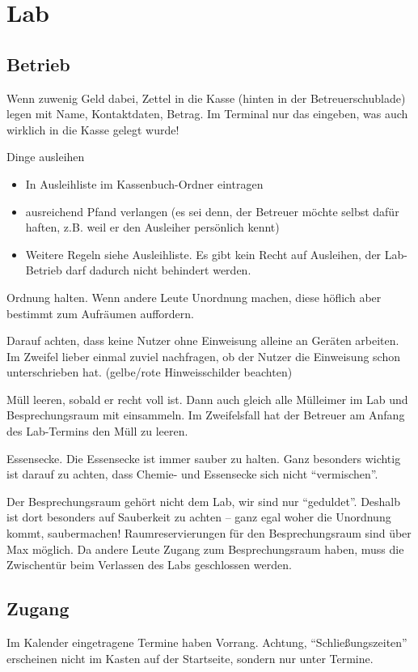 \documentclass{\basedir/fablab-document}
\begin{document}
\section{Lab}
\subsection{Betrieb}
Wenn zuwenig Geld dabei, Zettel in die Kasse (hinten in der Betreuerschublade) legen mit Name, Kontaktdaten, Betrag.
Im Terminal nur das eingeben, was auch wirklich in die Kasse gelegt wurde!

Dinge ausleihen
\begin{itemize}
 \item In Ausleihliste im Kassenbuch-Ordner eintragen
 \item ausreichend Pfand verlangen (es sei denn, der Betreuer möchte selbst dafür haften, z.B. weil er den Ausleiher persönlich kennt)
 \item Weitere Regeln siehe Ausleihliste. Es gibt kein Recht auf Ausleihen, der Lab-Betrieb darf dadurch nicht behindert werden.
\end{itemize}

Ordnung halten. Wenn andere Leute Unordnung machen, diese höflich aber bestimmt zum Aufräumen auffordern.

Darauf achten, dass keine Nutzer ohne Einweisung alleine an Geräten arbeiten. Im Zweifel lieber einmal zuviel nachfragen, ob der Nutzer die Einweisung schon unterschrieben hat. (gelbe/rote Hinweisschilder beachten)

Müll leeren, sobald er recht voll ist. Dann auch gleich alle Mülleimer im Lab und Besprechungsraum mit einsammeln. Im Zweifelsfall hat der Betreuer am Anfang des Lab-Termins den Müll zu leeren.

Essensecke. Die Essensecke ist immer sauber zu halten. Ganz besonders wichtig ist darauf zu achten, dass Chemie- und Essensecke sich nicht \enquote{vermischen}.

Der Besprechungsraum gehört nicht dem Lab, wir sind nur \enquote{geduldet}. Deshalb ist dort besonders auf Sauberkeit zu achten -- ganz egal woher die Unordnung kommt, saubermachen!
Raumreservierungen für den Besprechungsraum sind über Max möglich. Da andere Leute Zugang zum Besprechungsraum haben, muss die Zwischentür beim Verlassen des Labs geschlossen werden.

\subsection{Zugang}
Im Kalender eingetragene Termine haben Vorrang. Achtung, \enquote{Schließungszeiten} erscheinen nicht im Kasten auf der Startseite, sondern nur unter Termine.
\end{document}
